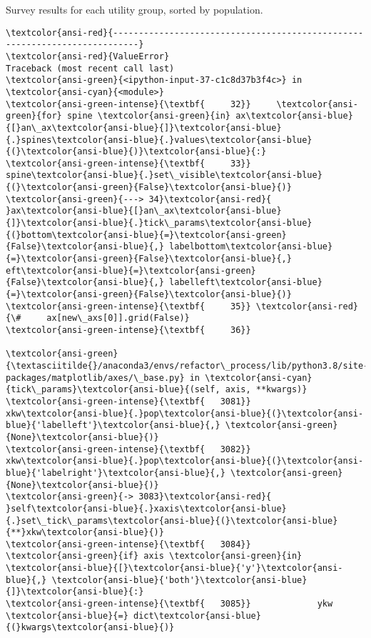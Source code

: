\documentclass[11pt]{article}
\begin{document}
Survey results for each utility group, sorted by population.

    \begin{Verbatim}[commandchars=\\\{\}, frame=single, framerule=2mm, rulecolor=\color{outerrorbackground}]
\textcolor{ansi-red}{---------------------------------------------------------------------------}
\textcolor{ansi-red}{ValueError}                                Traceback (most recent call last)
\textcolor{ansi-green}{<ipython-input-37-c1c8d37b3f4c>} in \textcolor{ansi-cyan}{<module>}
\textcolor{ansi-green-intense}{\textbf{     32}}     \textcolor{ansi-green}{for} spine \textcolor{ansi-green}{in} ax\textcolor{ansi-blue}{[}an\_ax\textcolor{ansi-blue}{]}\textcolor{ansi-blue}{.}spines\textcolor{ansi-blue}{.}values\textcolor{ansi-blue}{(}\textcolor{ansi-blue}{)}\textcolor{ansi-blue}{:}
\textcolor{ansi-green-intense}{\textbf{     33}}         spine\textcolor{ansi-blue}{.}set\_visible\textcolor{ansi-blue}{(}\textcolor{ansi-green}{False}\textcolor{ansi-blue}{)}
\textcolor{ansi-green}{---> 34}\textcolor{ansi-red}{     }ax\textcolor{ansi-blue}{[}an\_ax\textcolor{ansi-blue}{]}\textcolor{ansi-blue}{.}tick\_params\textcolor{ansi-blue}{(}bottom\textcolor{ansi-blue}{=}\textcolor{ansi-green}{False}\textcolor{ansi-blue}{,} labelbottom\textcolor{ansi-blue}{=}\textcolor{ansi-green}{False}\textcolor{ansi-blue}{,} eft\textcolor{ansi-blue}{=}\textcolor{ansi-green}{False}\textcolor{ansi-blue}{,} labelleft\textcolor{ansi-blue}{=}\textcolor{ansi-green}{False}\textcolor{ansi-blue}{)}
\textcolor{ansi-green-intense}{\textbf{     35}} \textcolor{ansi-red}{\#     ax[new\_axs[0]].grid(False)}
\textcolor{ansi-green-intense}{\textbf{     36}} 

\textcolor{ansi-green}{\textasciitilde{}/anaconda3/envs/refactor\_process/lib/python3.8/site-packages/matplotlib/axes/\_base.py} in \textcolor{ansi-cyan}{tick\_params}\textcolor{ansi-blue}{(self, axis, **kwargs)}
\textcolor{ansi-green-intense}{\textbf{   3081}}             xkw\textcolor{ansi-blue}{.}pop\textcolor{ansi-blue}{(}\textcolor{ansi-blue}{'labelleft'}\textcolor{ansi-blue}{,} \textcolor{ansi-green}{None}\textcolor{ansi-blue}{)}
\textcolor{ansi-green-intense}{\textbf{   3082}}             xkw\textcolor{ansi-blue}{.}pop\textcolor{ansi-blue}{(}\textcolor{ansi-blue}{'labelright'}\textcolor{ansi-blue}{,} \textcolor{ansi-green}{None}\textcolor{ansi-blue}{)}
\textcolor{ansi-green}{-> 3083}\textcolor{ansi-red}{             }self\textcolor{ansi-blue}{.}xaxis\textcolor{ansi-blue}{.}set\_tick\_params\textcolor{ansi-blue}{(}\textcolor{ansi-blue}{**}xkw\textcolor{ansi-blue}{)}
\textcolor{ansi-green-intense}{\textbf{   3084}}         \textcolor{ansi-green}{if} axis \textcolor{ansi-green}{in} \textcolor{ansi-blue}{[}\textcolor{ansi-blue}{'y'}\textcolor{ansi-blue}{,} \textcolor{ansi-blue}{'both'}\textcolor{ansi-blue}{]}\textcolor{ansi-blue}{:}
\textcolor{ansi-green-intense}{\textbf{   3085}}             ykw \textcolor{ansi-blue}{=} dict\textcolor{ansi-blue}{(}kwargs\textcolor{ansi-blue}{)}


\end{Verbatim}
\end{document}
